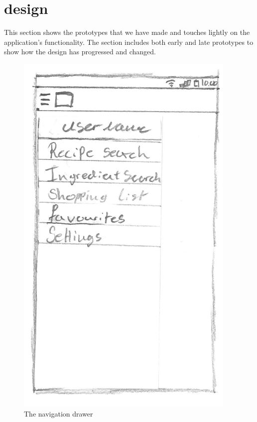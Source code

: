 \section{design}

This section shows the prototypes that we have made and touches lightly on the application's functionality. The section includes both early and late prototypes to show how the design has progressed and changed. 


\begin{figure}[H]
\begin{minipage}[b]{0.5\columnwidth}
\centering
\includegraphics[width=0.7\columnwidth]{img/prototypes/navigation_drawer.pdf}
\caption{The navigation drawer\label{fig:navdrawer}}
\end{minipage}
\hspace{0.5cm}
\begin{minipage}[b]{0.5\columnwidth}
\centering

\end{minipage}
\end{figure}

